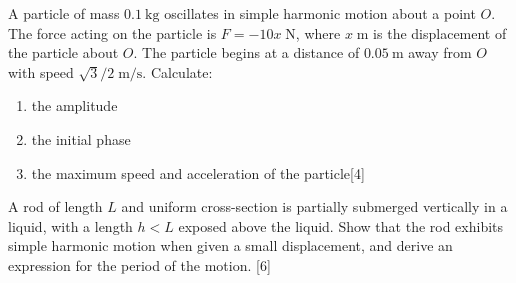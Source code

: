 \begin{problem}
    \begin{subproblem}
        A particle of mass $\qty{0.1}{\kg}$ oscillates in simple harmonic motion about a point $O$. The force acting on the particle is $F=-10 x\;\unit{\N}$, where $x\;\unit{\m}$ is the displacement of the particle about $O$. The particle begins at a distance of $\qty{0.05}{\m}$ away from $O$ with speed $\sqrt{3}/2\;\unit{\m\per\s}$. Calculate:
        \renewcommand{\theenumi}{(\alph{enumi})}
        \begin{enumerate}
            \item the amplitude
            \item the initial phase
            \item the maximum speed and acceleration of the particle\hfill{[4]}
        \end{enumerate}
    \end{subproblem}
    \begin{subproblem}
        A rod of length $L$ and uniform cross-section is partially submerged vertically in a liquid, with a length $h<L$ exposed above the liquid. Show that the rod exhibits simple harmonic motion when given a small displacement, and derive an expression for the period of the motion.
    \hfill{[6]}\end{subproblem}
\end{problem}

